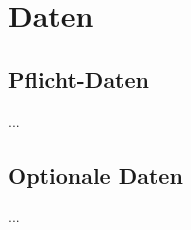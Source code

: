 %
%


\chapter{Daten}
\label{Daten}


\section*{Pflicht-Daten}

...
\\


\section*{Optionale Daten}

...
\\


